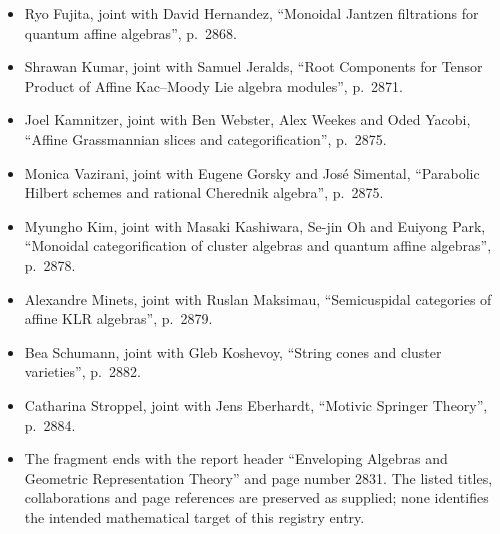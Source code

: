 \documentclass[11pt]{article}
\begin{document}
\begin{itemize}
\item Ryo Fujita, joint with David Hernandez, ``Monoidal Jantzen filtrations for quantum affine algebras'', p.~2868.
\item Shrawan Kumar, joint with Samuel Jeralds, ``Root Components for Tensor Product of Affine Kac--Moody Lie algebra modules'', p.~2871.
\item Joel Kamnitzer, joint with Ben Webster, Alex Weekes and Oded Yacobi, ``Affine Grassmannian slices and categorification'', p.~2875.
\item Monica Vazirani, joint with Eugene Gorsky and José Simental, ``Parabolic Hilbert schemes and rational Cherednik algebra'', p.~2875.
\item Myungho Kim, joint with Masaki Kashiwara, Se-jin Oh and Euiyong Park, ``Monoidal categorification of cluster algebras and quantum affine algebras'', p.~2878.
\item Alexandre Minets, joint with Ruslan Maksimau, ``Semicuspidal categories of affine KLR algebras'', p.~2879.
\item Bea Schumann, joint with Gleb Koshevoy, ``String cones and cluster varieties'', p.~2882.
\item Catharina Stroppel, joint with Jens Eberhardt, ``Motivic Springer Theory'', p.~2884.
\item The fragment ends with the report header ``Enveloping Algebras and Geometric Representation Theory'' and page number 2831. The listed titles, collaborations and page references are preserved as supplied; none identifies the intended mathematical target of this registry entry.
\end{itemize}
\end{document}
